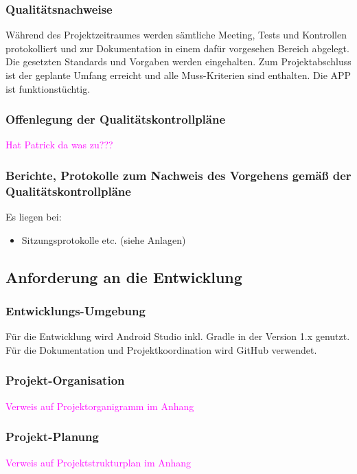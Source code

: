 \subsubsection{Qualitätsnachweise}
Während des Projektzeitraumes werden sämtliche Meeting, Tests und Kontrollen protokolliert und zur Dokumentation in einem dafür vorgesehen Bereich abgelegt. Die gesetzten Standards und Vorgaben werden eingehalten. Zum Projektabschluss ist der geplante Umfang erreicht und alle Muss-Kriterien sind enthalten. Die APP ist funktionstüchtig.



\subsubsection{Offenlegung der Qualitätskontrollpläne}
\textcolor{magenta}{Hat Patrick da was zu???}



\subsubsection{Berichte, Protokolle zum Nachweis des Vorgehens gemäß der Qualitätskontrollpläne}
Es liegen bei:
\begin{itemize}
	\item Sitzungsprotokolle etc. (siehe Anlagen)
\end{itemize}



\subsection{\textbf{Anforderung an die Entwicklung}}

\subsubsection{Entwicklungs-Umgebung}
Für die Entwicklung wird Android Studio inkl. Gradle in der Version 1.x genutzt. Für die Dokumentation und Projektkoordination wird GitHub verwendet.



\subsubsection{Projekt-Organisation}
\textcolor{magenta}{Verweis auf Projektorganigramm im Anhang}


\subsubsection{Projekt-Planung}
\textcolor{magenta}{Verweis auf Projektstrukturplan im Anhang}

